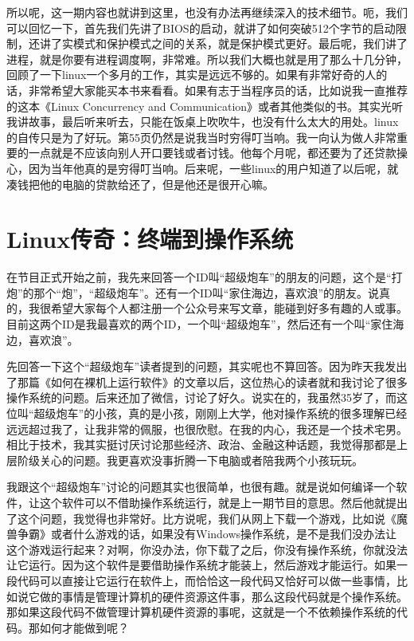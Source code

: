 \documentclass[
  letterpaper,
  DIV=11,
  numbers=noendperiod]{scrreprt}
\begin{document}
所以呢，这一期内容也就讲到这里，也没有办法再继续深入的技术细节。呃，我们可以回忆一下，首先我们先讲了BIOS的启动，就讲了如何突破512个字节的启动限制，还讲了实模式和保护模式之间的关系，就是保护模式更好。最后呢，我们讲了进程，就是你要有进程调度啊，非常难。所以我们大概也就是用了那么十几分钟，回顾了一下linux一个多月的工作，其实是远远不够的。如果有非常好奇的人的话，非常希望大家能买本书来看看。如果有志于当程序员的话，比如说我一直推荐的这本《Linux
Concurrency and
Communication》或者其他类似的书。其实光听我讲故事，最后听来听去，只能在饭桌上吹吹牛，也没有什么太大的用处。linux的自传只是为了好玩。第55页仍然是说我当时穷得叮当响。我一向认为做人非常重要的一点就是不应该向别人开口要钱或者讨钱。他每个月呢，都还要为了还贷款操心，因为当年他真的是穷得叮当响。后来呢，一些linux的用户知道了以后呢，就凑钱把他的电脑的贷款给还了，但是他还是很开心嘛。


\chapter{Linux传奇：终端到操作系统}\label{linuxux4f20ux5947ux7ec8ux7aefux5230ux64cdux4f5cux7cfbux7edf}

在节目正式开始之前，我先来回答一个ID叫``超级炮车''的朋友的问题，这个是``打炮''的那个``炮''，``超级炮车''。还有一个ID叫``家住海边，喜欢浪''的朋友。说真的，我很希望大家每个人都注册一个公众号来写文章，能碰到好多有趣的人或事。目前这两个ID是我最喜欢的两个ID，一个叫``超级炮车''，然后还有一个叫``家住海边，喜欢浪''。

先回答一下这个``超级炮车''读者提到的问题，其实呢也不算回答。因为昨天我发出了那篇《如何在裸机上运行软件》的文章以后，这位热心的读者就和我讨论了很多操作系统的问题。后来还加了微信，讨论了好久。说实在的，我虽然35岁了，而这位叫``超级炮车''的小孩，真的是小孩，刚刚上大学，他对操作系统的很多理解已经远远超过我了，让我非常的佩服，也很欣慰。在我的内心，我还是一个技术宅男。相比于技术，我其实挺讨厌讨论那些经济、政治、金融这种话题，我觉得那都是上层阶级关心的问题。我更喜欢没事折腾一下电脑或者陪我两个小孩玩玩。

我跟这个``超级炮车''讨论的问题其实也很简单，也很有趣。就是说如何编译一个软件，让这个软件可以不借助操作系统运行，就是上一期节目的意思。然后他就提出了这个问题，我觉得也非常好。比方说呢，我们从网上下载一个游戏，比如说《魔兽争霸》或者什么游戏的话，如果没有Windows操作系统，是不是我们没办法让这个游戏运行起来？对啊，你没办法，你下载了之后，你没有操作系统，你就没法让它运行。因为这个软件是要借助操作系统才能装上，然后游戏才能运行。如果一段代码可以直接让它运行在软件上，而恰恰这一段代码又恰好可以做一些事情，比如说它做的事情是管理计算机的硬件资源这件事，那么这段代码就是个操作系统。那如果这段代码不做管理计算机硬件资源的事呢，这就是一个不依赖操作系统的代码。那如何才能做到呢？
\end{document}
